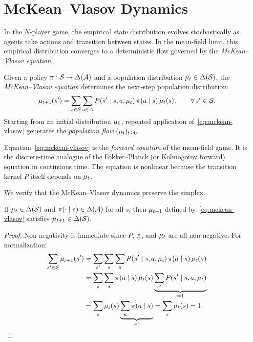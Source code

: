 \documentclass[11pt,a4paper]{article}
\begin{document}
\section{McKean--Vlasov Dynamics}
\label{sec:mckean-vlasov}

In the $N$-player game, the empirical state distribution evolves
stochastically as agents take actions and transition between states.
In the mean-field limit, this empirical distribution converges to a
deterministic flow governed by the \emph{McKean--Vlasov equation}.

\begin{definition}
\label{def:mckean-vlasov}
Given a policy $\pi: \mathcal{S} \to \Delta(\mathcal{A})$ and a
population distribution $\mu_t \in \Delta(\mathcal{S})$, the
\emph{McKean--Vlasov equation} determines the next-step population
distribution:
\begin{equation}
\label{eq:mckean-vlasov}
  \mu_{t+1}(s') = \sum_{s \in \mathcal{S}}
    \sum_{a \in \mathcal{A}}
    P(s' \mid s, a, \mu_t)\,
    \pi(a \mid s)\,
    \mu_t(s),
    \qquad \forall\, s' \in \mathcal{S}.
\end{equation}
Starting from an initial distribution $\mu_0$, repeated
application of~\eqref{eq:mckean-vlasov} generates the
\emph{population flow} $(\mu_t)_{t \geq 0}$.
\end{definition}

\begin{remark}
\label{rem:forward-equation}
Equation~\eqref{eq:mckean-vlasov} is the \emph{forward equation}
of the mean-field game.  It is the discrete-time analogue of the
Fokker--Planck (or Kolmogorov forward) equation in continuous time.
The equation is nonlinear because the transition kernel $P$ itself
depends on $\mu_t$.
\end{remark}

We verify that the McKean--Vlasov dynamics preserve the simplex.

\begin{lemma}
\label{lem:simplex-invariance}
If $\mu_t \in \Delta(\mathcal{S})$ and $\pi(\cdot \mid s)
\in \Delta(\mathcal{A})$ for all $s$, then $\mu_{t+1}$ defined
by~\eqref{eq:mckean-vlasov} satisfies $\mu_{t+1}
\in \Delta(\mathcal{S})$.
\end{lemma}

\begin{proof}
Non-negativity is immediate since $P$, $\pi$, and $\mu_t$
are all non-negative.  For normalization:
\begin{align*}
  \sum_{s' \in \mathcal{S}} \mu_{t+1}(s')
  &= \sum_{s'} \sum_{s} \sum_{a}
    P(s' \mid s, a, \mu_t)\,
    \pi(a \mid s)\, \mu_t(s) \\
  &= \sum_{s} \sum_{a} \pi(a \mid s)\, \mu_t(s)
    \underbrace{\sum_{s'} P(s' \mid s, a, \mu_t)}_{=1} \\
  &= \sum_{s} \mu_t(s)
    \underbrace{\sum_{a} \pi(a \mid s)}_{=1}
  = \sum_{s} \mu_t(s) = 1. \qedhere
\end{align*}
\end{proof}
\end{document}
